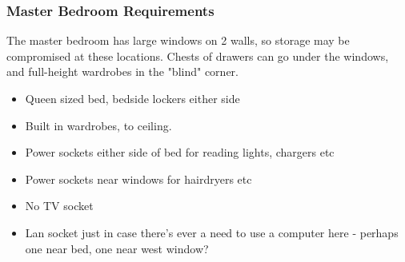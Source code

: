 \subsubsection{Master Bedroom Requirements}
The master bedroom has large windows on 2 walls, so storage may be compromised at these locations. 
Chests of drawers can go under the windows, and full-height wardrobes in the "blind" corner.

\begin{itemize}
\item Queen sized bed, bedside lockers either side
\item Built in wardrobes, to ceiling.
\item Power sockets either side of bed for reading lights, chargers etc
\item Power sockets near windows for hairdryers etc
\item No TV socket
\item Lan socket just in case there's ever a need to use a computer here - perhaps one near bed, one near west window?

\end{itemize}

